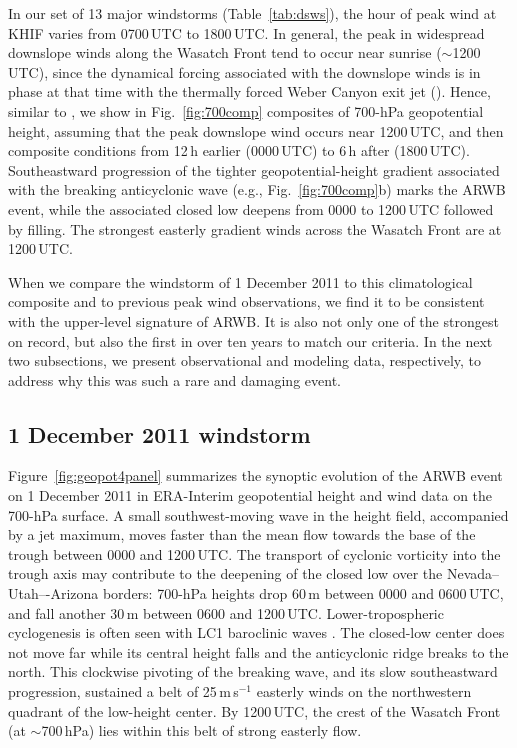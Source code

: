 \documentclass[pdftex,12pt]{article}
\def\mps{m\,s$^{-1}$}
\def\around{$\sim$}
\begin{document}
In our set of 13 major windstorms (Table~\ref{tab:dsws}), the hour of peak wind at KHIF varies from 0700\,UTC to 1800\,UTC. In general, the peak in widespread downslope winds along the Wasatch Front tend to occur near sunrise (\around 1200\,UTC), since the dynamical forcing associated with the downslope winds is in phase at that time with the thermally forced Weber Canyon exit jet (\citealt{Chrust2013}). Hence, similar to \citet{Holland2002}, we show in Fig.~\ref{fig:700comp} composites of 700-hPa geopotential height, assuming that the peak downslope wind occurs near 1200\,UTC, and then composite conditions from 12\,h earlier (0000\,UTC) to 6\,h after (1800\,UTC). Southeastward progression of the tighter geopotential-height gradient associated with the breaking anticyclonic wave (e.g.,  Fig.~\ref{fig:700comp}b) marks the ARWB event, while the associated closed low deepens from 0000 to 1200\,UTC followed by filling. The strongest easterly gradient winds across the Wasatch Front are at 1200\,UTC.

When we compare the windstorm of 1 December 2011 to this climatological composite and to previous peak wind observations, we find it to be consistent with the upper-level signature of ARWB. It is also not only one of the strongest on record, but also the first in over ten years to match our criteria. In the next two subsections, we present observational and modeling data, respectively, to address why this was such a rare and damaging event.

\subsection{1 December 2011 windstorm}
Figure~\ref{fig:geopot4panel} summarizes the synoptic evolution of the ARWB event on 1 December 2011 in ERA-Interim geopotential height and wind data on the 700-hPa surface.  A small southwest-moving wave in the height field, accompanied by a jet maximum, moves faster than the mean flow towards the base of the trough between 0000 and 1200\,UTC. The transport of cyclonic vorticity into the trough axis may contribute to the deepening of the closed low over the Nevada--Utah–-Arizona borders: 700-hPa heights drop 60\,m between 0000 and 0600\,UTC, and fall another 30\,m between 0600 and 1200\,UTC. Lower-tropospheric cyclogenesis is often seen with LC1 baroclinic waves \citep{Thorncroft1993}. The closed-low center does not move far while its central height falls and the anticyclonic ridge breaks to the north. This clockwise pivoting of the breaking wave, and its slow southeastward progression, sustained a belt of 25\,\mps{} easterly winds on the northwestern quadrant of the low-height center. By 1200\,UTC, the crest of the Wasatch Front (at \around 700\,hPa) lies within this belt of strong easterly flow.
\end{document}
